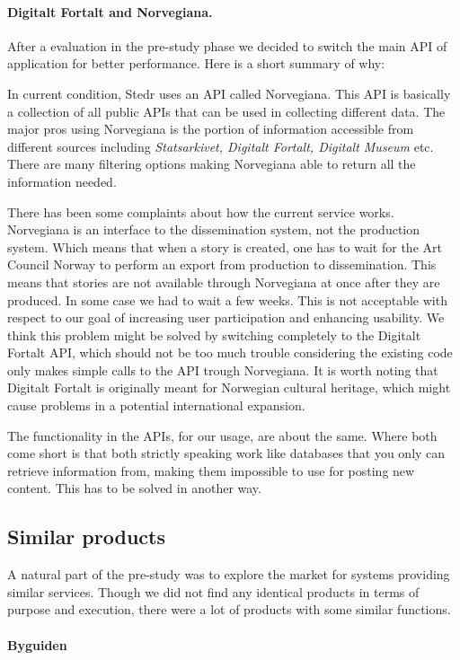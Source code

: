 \paragraph{Digitalt Fortalt and Norvegiana.}

After a evaluation in the pre-study phase we decided to switch the main API of application for better performance. Here is a short summary of why:

In current condition, Stedr uses an API called Norvegiana. This API is basically a collection of all public APIs that can be used in collecting different data. The major pros using Norvegiana is the portion of information accessible from different sources including \emph{Statsarkivet, Digitalt Fortalt, Digitalt Museum} etc. There are many filtering options making Norvegiana able to return all the information needed.

There has been some complaints about how the current service works. Norvegiana is an interface to the dissemination system, not the production system. Which means that when a story is created, one has to wait for the Art Council Norway to perform an export from production to dissemination. This means that stories are not available through Norvegiana at once after they are produced. In some case we had to wait a few weeks. This is not acceptable with respect to our goal of increasing user participation and enhancing usability. We think this problem might be solved by switching completely to the Digitalt Fortalt API, which should not be too much trouble considering the existing code only makes simple calls to the API trough Norvegiana. It is worth noting that Digitalt Fortalt is originally meant for Norwegian cultural heritage, which might cause problems in a potential international expansion.

The functionality in the APIs, for our usage, are about the same. Where both come short is that both strictly speaking work like databases that you only can retrieve information from, making them impossible to use for posting new content. This has to be solved in another way.

	\subsection{Similar products}
		
A natural part of the pre-study was to explore the market for systems providing similar services. Though we did not find any identical products in terms of purpose and execution, there were a lot of products with some similar functions. 

\paragraph{Byguiden}


